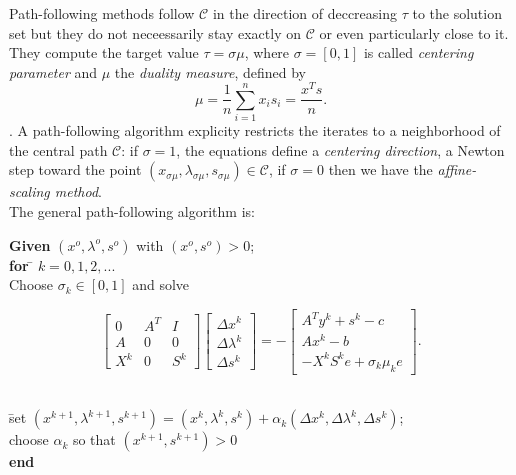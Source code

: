 \documentclass[a4paper,10 pt,titlepage,twoside]{book}
\theoremstyle{plain}
\theoremstyle{definition}
\theoremstyle{remark}
\begin{document}
 Path-following methods follow $\mathcal{C}$ in the direction of deccreasing $\tau$ to the solution set but they do not neceessarily stay exactly on $\mathcal{C}$ or even particularly close to it. They compute the target value $\tau = \sigma \mu$, where $\sigma = [0,1]$ is called \textit{centering parameter} and $\mu$ the \textit{duality measure}, defined by
  \begin{equation*}
 \mu = \frac{1}{n}\sum_{i=1}^{n} x_{i}s_{i} = \frac{x^{T}s}{n}.
 \end{equation*}.
 A path-following algorithm explicity restricts the iterates to a neighborhood of the central path $\mathcal{C}$: if $\sigma = 1$, the equations define a \textit{centering direction}, a Newton step toward the point $(x_{\sigma\mu},\lambda_{\sigma\mu}, s_{\sigma\mu})\in\mathcal{C}$, if $\sigma = 0$ then we have the \textit{affine-scaling method}.\\  
The general path-following algorithm is:
\begin{tabbing}
\textbf{Given} $(x^{o}, \lambda^{o}, s^{o})$ with $(x^{o}, s^{o})>0$;\\
\textbf{for} \= $k = 0, 1, 2,...$ \\
\> Choose $\sigma_{k}\in[0,1]$ and solve
\end{tabbing}
\begin{equation}\label{(5.8)}
	\begin{bmatrix}\label{P}
	0&A^{T}&I \\A&0&0\\X^{k}&0&S^{k}
	\end{bmatrix}\begin{bmatrix}
	\Delta x^{k}\\\Delta\lambda^{k} \\\Delta s^{k}
	\end{bmatrix}=-\begin{bmatrix}
	A^{T}y^{k}+s^{k}-c\\Ax^{k}-b\\-X^{k}S^{k}e + \sigma_{k}\mu_{k}e
	\end{bmatrix}.
\end{equation}
\begin{tabbing}
	\\
	\=set $(x^{k+1}, \lambda^{k+1}, s^{k+1}) = (x^{k}, \lambda^{k}, s^{k})+ \alpha_{k}(\Delta x^{k}, \Delta\lambda^{k}, \Delta s^{k})$;\\
	\> choose $\alpha_{k}$ so that $(x^{k+1}, s^{k+1})>0$ \\
	\textbf{end}
\end{tabbing}
\end{document}
